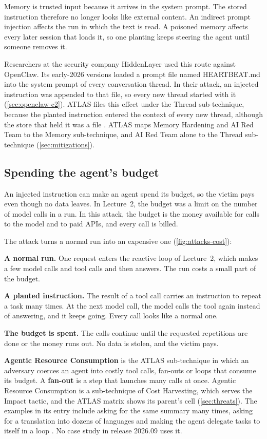 Memory is trusted input because it arrives in the system prompt. The stored instruction therefore
no longer looks like external content.
An indirect prompt injection affects the run in which the text is read. A poisoned memory affects
every later session that loads it, so one planting keeps steering the agent until someone removes
it.

Researchers at the security company HiddenLayer used this route against OpenClaw. Its early-2026
versions loaded a prompt file named HEARTBEAT.md into the system prompt of every conversation
thread. In their attack, an injected instruction was appended to that file, so every new thread
started with it (\cref{sec:openclaw-c2}). ATLAS files this effect under the Thread sub-technique,
because the planted instruction entered the context of every new thread, although the store that
held it was a file \citep{atlas-cs0051-openclaw-c2}. ATLAS maps Memory Hardening and AI Red Team to
the Memory sub-technique, and AI Red Team alone to the Thread sub-technique (\cref{sec:mitigations}).

\subsection{Spending the agent's budget}
\label{sec:attacks-cost}

An injected instruction can make an agent spend its budget, so the victim pays even though no data
leaves. In Lecture~2, the budget was a limit on the number of model calls in a run. In this attack,
the budget is the money available for calls to the model and to paid APIs, and every call is
billed.

The attack turns a normal run into an expensive one (\cref{fig:attacks-cost}):
\be
\item \textbf{A normal run.} One request enters the reactive loop of Lecture~2, which makes a few
model calls and tool calls and then answers. The run costs a small part of the budget.
\item \textbf{A planted instruction.} The result of a tool call carries an instruction to repeat a
task many times. At the next model call, the model calls the tool again instead of answering, and
it keeps going. Every call looks like a normal one.
\item \textbf{The budget is spent.} The calls continue until the requested repetitions are done or
the money runs out. No data is stolen, and the victim pays.
\ee

\textbf{Agentic Resource Consumption} is the ATLAS sub-technique in which an adversary coerces an
agent into costly tool calls, fan-outs or loops that consume its budget. A \textbf{fan-out} is a step that launches
many calls at once. Agentic Resource Consumption is a sub-technique of Cost Harvesting, which serves
the Impact tactic, and the ATLAS matrix shows its parent's cell (\cref{sec:threats}). The examples
in its entry include asking for the same summary many times, asking for a translation into dozens
of languages and making the agent delegate tasks to itself in a loop \citep{mitre-atlas-2026}. No
case study in release 2026.09 uses it.

